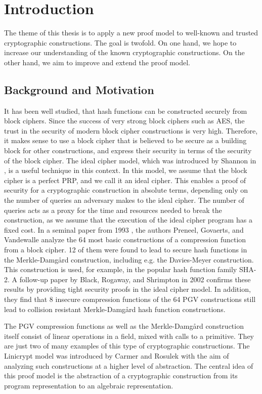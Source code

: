 \chapter{Introduction}
\renewcommand{\MD}{Merkle-Damg\aa rd }
 
The theme of this thesis is to apply a new proof model to well-known and trusted cryptographic constructions.
The goal is twofold.
On one hand, we hope to increase our understanding of the known cryptographic constructions.
On the other hand, we aim to improve and extend the proof model.

\section{Background and Motivation}

It has been well studied, that hash functions can be constructed securely from block ciphers.
Since the success of very strong block ciphers such as AES, 
the trust in the security of modern block cipher constructions is very high.
Therefore, it makes sense to use a block cipher that is believed to be secure as a building block for other constructions,
and express their security in terms of the security of the block cipher.
The ideal cipher model, which was introduced by Shannon in \cite{Shannon49},
is a useful technique in this context.
In this model, we assume that the block cipher is a perfect PRP, and we call it an ideal cipher.
This enables a proof of security for a cryptographic construction in absolute terms,
depending only on the number of queries an adversary makes to the ideal cipher.
The number of queries acts as a proxy for the time and resources needed to break the construction,
as we assume that the execution of the ideal cipher program has a fixed cost.
In a seminal paper from 1993 \cite{C:PreGovVan93}, the authors Preneel, Govaerts, and Vandewalle analyze the 64 most basic constructions of a compression function from a block cipher.
12 of them were found to lead to secure hash functions in the \MD construction, including e.g. the Davies-Meyer construction.
This construction is used, for example, in the popular hash function family SHA-2.
A follow-up paper by Black, Rogaway, and Shrimpton \cite{C:BlaRogShr02} in 2002 confirms these results
by providing tight security proofs in the ideal cipher model.
In addition, 
they find that 8 insecure compression functions of the 64 PGV constructions still lead to collision resistant \MD hash function constructions.

The PGV compression functions as well as the \MD construction itself consist of linear operations in a field,
mixed with calls to a primitive.
They are just two of many examples of this type of cryptographic constructions.
The Linicrypt model was introduced by Carmer and Rosulek \cite{C:CarRos16}
with the aim of analyzing such constructions at a higher level of abstraction.
The central idea of this proof model is the abstraction of a cryptographic construction from its program representation to an algebraic representation.

